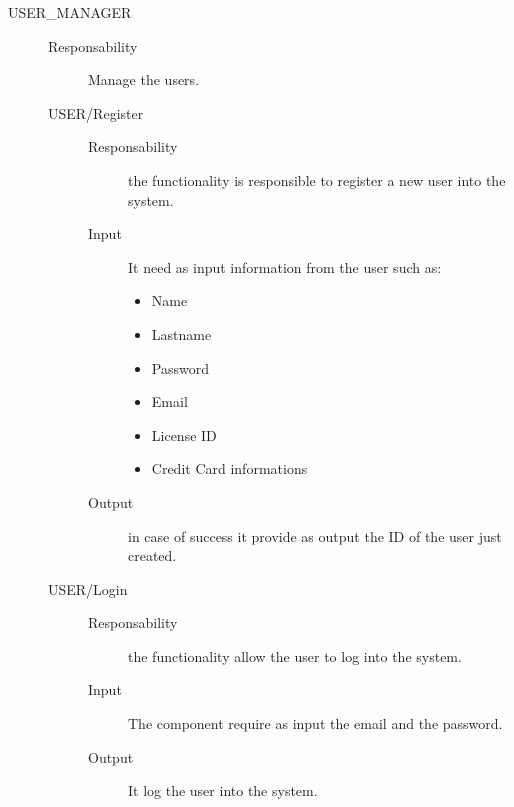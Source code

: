 \documentclass[11pt]{article} %
\begin{document}
\begin{description}
	\item[USER\_MANAGER] \hfill
	\begin{description}
		\item[Responsability] Manage the users.
	\item[USER/Register] \hfill
		\begin{description}
			\item[Responsability] the functionality is responsible to register a new user into the system.
			\item[Input] It need as input information from the user such as:
				\begin{itemize}
					\item Name
					\item Lastname
					\item Password
					\item Email
					\item License ID
					\item Credit Card informations
				\end{itemize}
			\item[Output] in case of success it provide as output the ID of the user just created.
		\end{description}
	\item[USER/Login] \hfill
		\begin{description}
			\item[Responsability] the functionality allow the user to log into the system.
			\item[Input] The component require as input the email and the password.
			\item[Output] It log the user into the system.
		\end{description}
	\end{description}
	

\end{description}
\end{document}
